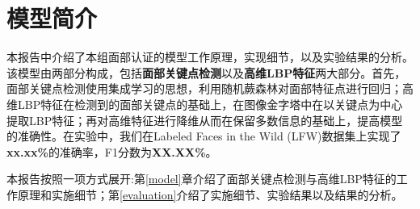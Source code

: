 \section{模型简介}
\label{intro}

本报告中介绍了本组面部认证的模型工作原理，实现细节，以及实验结果的分析。该模型由两部分构成，包括\textbf{面部关键点检测}以及\textbf{高维LBP特征}两大部分。首先，面部关键点检测使用集成学习的思想，利用随机蕨森林对面部特征点进行回归；高维LBP特征在检测到的面部关键点的基础上，在图像金字塔中在以关键点为中心提取LBP特征；再对高维特征进行降维从而在保留多数信息的基础上，提高模型的准确性。在实验中，我们在Labeled Faces in the Wild (LFW)数据集上实现了\textbf{xx.xx\%}的准确率，F1分数为\textbf{XX.XX\%}。

本报告按照一项方式展开:第\ref{model}章介绍了面部关键点检测与高维LBP特征的工作原理和实施细节；第\ref{evaluation}介绍了实施细节、实验结果以及结果的分析。